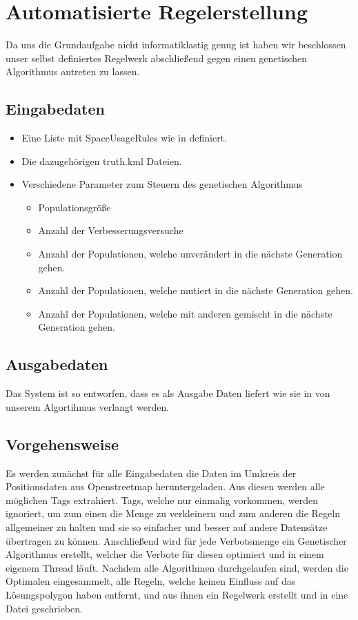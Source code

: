 \section{Automatisierte Regelerstellung}
Da uns die Grundaufgabe nicht informatiklastig genug ist
haben wir beschlossen unser selbst definiertes Regelwerk abschließend gegen
einen genetischen Algorithmus antreten zu lassen.

\subsection{Eingabedaten}
\begin{itemize}
\item Eine Liste mit SpaceUsageRules wie in  definiert.
\item Die dazugehörigen truth.kml Dateien.
\item Verschiedene Parameter zum Steuern des genetischen Algorithmus
  \begin{itemize}
  \item Populationsgröße
  \item Anzahl der Verbesserungsversuche
  \item Anzahl der Populationen, welche unverändert in die nächste Generation gehen.
  \item Anzahl der Populationen, welche mutiert in die nächste Generation gehen.
  \item Anzahl der Populationen, welche mit anderen gemischt in die nächste Generation gehen.
  \end{itemize}
\end{itemize}

\subsection{Ausgabedaten}
Das System ist so entworfen, dass es als Ausgabe Daten liefert wie sie in  von unserem Algortihmus verlangt werden.

\subsection{Vorgehensweise}
Es werden zunächst für alle Eingabedaten die Daten im Umkreis der Positionsdaten aus Openstreetmap heruntergeladen.
Aus diesen werden alle möglichen Tags extrahiert. Tags, welche nur einmalig vorkommen, werden ignoriert, um zum einen die Menge zu verkleinern
und zum anderen die Regeln allgemeiner zu halten und sie so einfacher und besser auf andere Datensätze übertragen zu können.
Anschließend wird für jede Verbotsmenge ein Genetischer Algorithmus erstellt,
welcher die Verbote für diesen optimiert und in einem eigenem Thread läuft.
Nachdem alle Algorithmen durchgelaufen sind, werden die Optimalen eingesammelt,
alle Regeln, welche keinen Einfluss auf das Lösungspolygon haben entfernt,
und aus ihnen ein Regelwerk erstellt und in eine Datei geschrieben.

